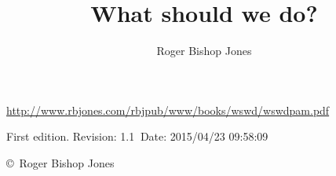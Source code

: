 \documentclass[10pt,a4paper.titlepage,openany,twocolumn]{book}
\author{Roger Bishop Jones}
\title{What should we do?}
\begin{document}
\begin{titlepage}
\maketitle

\vfill

\begin{centering}

{\footnotesize



\href{http://www.rbjones.com/rbjpub/www/books/wswd/wswdpam.pdf}
{http://www.rbjones.com/rbjpub/www/books/wswd/wswdpam.pdf}

First edition. $ $Revision: 1.1 $~$Date: 2015/04/23 09:58:09 $ $

\vspace{0.2in}

\copyright\ Roger Bishop Jones

}%

\end{centering}

\thispagestyle{empty}
\end{titlepage}

\onecolumn


{\parskip=0pt\tableofcontents}

\vfill

\pagebreak

\twocolumn
\end{document}
